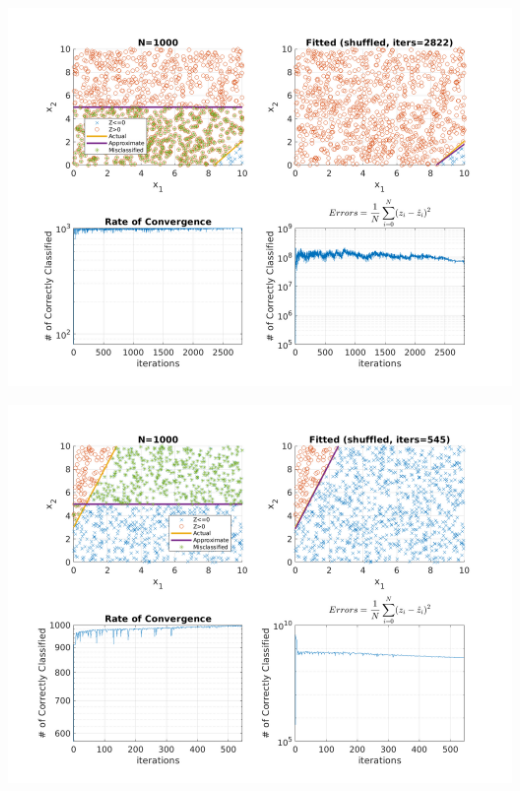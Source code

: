 \documentclass{article}
\newenvironment{Figure}
  {\par\medskip\noindent\minipage{\linewidth}}
  {\endminipage\par\medskip}
\begin{document}
\begin{multicols}{2}
\begin{Figure}
\end{Figure}
\begin{Figure}
\centering
\includegraphics[width=\linewidth]{pngs/n1000_shuffled4.png}
\end{Figure}
\begin{Figure}
\centering
\includegraphics[width=\linewidth]{pngs/n1000_shuffled5.png}
\end{Figure}


\end{multicols}
\end{document}

